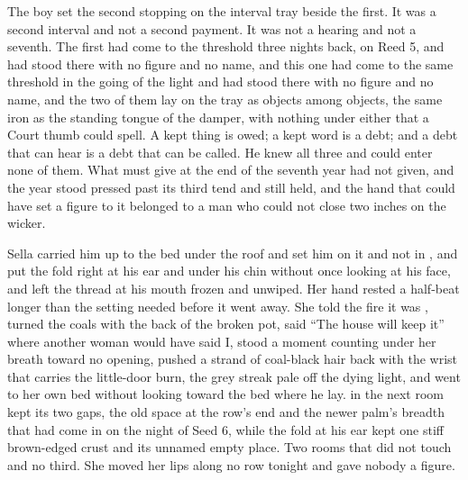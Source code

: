 The boy set the second stopping on the interval tray beside the first. It was a second interval and not a second payment. It was not a hearing and not a seventh. The first had come to the threshold three nights back, on Reed 5, and had stood there with no figure and no name, and this one had come to the same threshold in the going of the light and had stood there with no figure and no name, and the two of them lay on the tray as objects among objects, the same iron as the standing tongue of the damper, with nothing under either that a Court thumb could spell. A kept thing is owed; a kept word is a debt; and a debt that can hear is a debt that can be called. He knew all three and could enter none of them. What must give at the end of the seventh year had not given, and the year stood pressed past its third tend and still held, and the hand that could have set a figure to it belonged to a man who could not close two inches on the wicker.

Sella carried him up to the bed under the roof and set him on it and not in , and put the fold right at his ear and under his chin without once looking at his face, and left the thread at his mouth frozen and unwiped. Her hand rested a half-beat longer than the setting needed before it went away. She told the fire it was , turned the coals with the back of the broken pot, said “The house will keep it” where another woman would have said I, stood a moment counting under her breath toward no opening, pushed a strand of coal-black hair back with the wrist that carries the little-door burn, the grey streak pale off the dying light, and went to her own bed without looking toward the bed where he lay.  in the next room kept its two gaps, the old space at the row's end and the newer palm's breadth that had come in on the night of Seed 6, while the fold at his ear kept one stiff brown-edged crust and its unnamed empty place. Two rooms that did not touch and no third. She moved her lips along no row tonight and gave nobody a figure.

